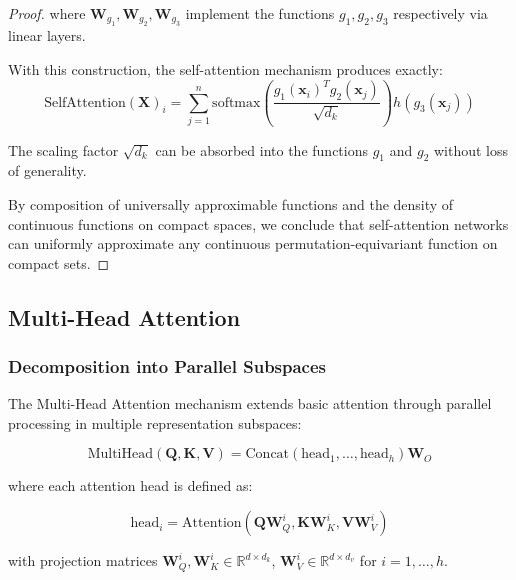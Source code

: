 \begin{proof}
    where $\mathbf{W}_{g_1}, \mathbf{W}_{g_2}, \mathbf{W}_{g_3}$ implement the functions $g_1, g_2, g_3$ respectively via linear layers.

    With this construction, the self-attention mechanism produces exactly:
    \begin{equation}
        \text{SelfAttention}(\mathbf{X})_i = \sum_{j=1}^n \text{softmax}\left(\frac{g_1(\mathbf{x}_i)^T g_2(\mathbf{x}_j)}{\sqrt{d_k}}\right) h(g_3(\mathbf{x}_j))
        \label{eq:self_attention_implementation}
    \end{equation}

    The scaling factor $\sqrt{d_k}$ can be absorbed into the functions $g_1$ and $g_2$ without loss of generality.

    By composition of universally approximable functions and the density of continuous functions on compact spaces, we conclude that self-attention networks can uniformly approximate any continuous permutation-equivariant function on compact sets.
\end{proof}

\subsection{Multi-Head Attention}

\subsubsection{Decomposition into Parallel Subspaces}

The Multi-Head Attention mechanism extends basic attention through parallel processing in multiple representation subspaces:

\begin{equation}
    \text{MultiHead}(\mathbf{Q}, \mathbf{K}, \mathbf{V}) = \text{Concat}(\text{head}_1, \ldots, \text{head}_h)\mathbf{W}_O
    \label{eq:multihead_attention}
\end{equation}

where each attention head is defined as:

\begin{equation}
    \text{head}_i = \text{Attention}(\mathbf{Q}\mathbf{W}_Q^i, \mathbf{K}\mathbf{W}_K^i, \mathbf{V}\mathbf{W}_V^i)
    \label{eq:attention_head}
\end{equation}

with projection matrices $\mathbf{W}_Q^i, \mathbf{W}_K^i \in \mathbb{R}^{d \times d_k}$, $\mathbf{W}_V^i \in \mathbb{R}^{d \times d_v}$ for $i = 1, \ldots, h$.

